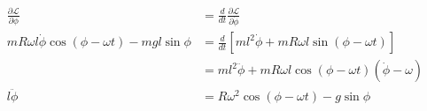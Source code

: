 \documentclass{article}
\begin{document}
\begin{align*}
  \frac{\partial \mathcal{L}}{\partial \phi}                       & = \frac{d}{d t} \frac{\partial \mathcal{L}}{\partial \dot{\phi}}                \\
  m R \omega l \dot{\phi} \cos (\phi - \omega t) - m g l \sin \phi & = \frac{d}{d t} [m l^2 \dot{\phi} + m R \omega l \sin (\phi - \omega t)]        \\
                                                                   & = m l^2 \ddot{\phi} + m R \omega l \cos (\phi - \omega t) (\dot{\phi} - \omega) \\
  l \ddot{\phi}                                                    & = R \omega^2 \cos (\phi - \omega t) - g \sin \phi
\end{align*}

\setcounter{subsection}{30}
\subsection{}
\end{document}
